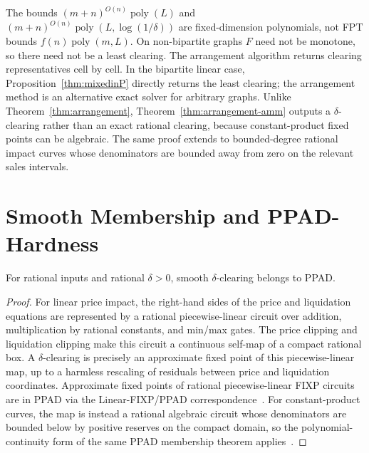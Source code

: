 \documentclass{llncs}
\newcommand{\poly}{\operatorname{poly}}
\begin{document}
\begin{remark}
The bounds \((m+n)^{O(n)}\poly(L)\) and \((m+n)^{O(n)}\poly(L,\log(1/\delta))\) are fixed-dimension polynomials, not FPT bounds \(f(n)\poly(m,L)\). On non-bipartite graphs \(F\) need not be monotone, so there need not be a least clearing. The arrangement algorithm returns clearing representatives cell by cell. In the bipartite linear case, Proposition~\ref{thm:mixedinP} directly returns the least clearing; the arrangement method is an alternative exact solver for arbitrary graphs. Unlike Theorem~\ref{thm:arrangement}, Theorem~\ref{thm:arrangement-amm} outputs a \(\delta\)-clearing rather than an exact rational clearing, because constant-product fixed points can be algebraic. The same proof extends to bounded-degree rational impact curves whose denominators are bounded away from zero on the relevant sales intervals.
\end{remark}

\section{Smooth Membership and PPAD-Hardness}
\label{sec:hardness}
\begin{proposition}
For rational inputs and rational \(\delta>0\), smooth \(\delta\)-clearing belongs to PPAD.
\end{proposition}
\begin{proof}
For linear price impact, the right-hand sides of the price and liquidation equations are represented by a rational piecewise-linear circuit over addition, multiplication by rational constants, and min/max gates. The price clipping and liquidation clipping make this circuit a continuous self-map of a compact rational box. A \(\delta\)-clearing is precisely an approximate fixed point of this piecewise-linear map, up to a harmless rescaling of residuals between price and liquidation coordinates. Approximate fixed points of rational piecewise-linear FIXP circuits are in PPAD via the Linear-FIXP/PPAD correspondence~\cite{EtessamiYannakakis2010}. For constant-product curves, the map is instead a rational algebraic circuit whose denominators are bounded below by positive reserves on the compact domain, so the polynomial-continuity form of the same PPAD membership theorem applies~\cite[Proposition~2]{EtessamiYannakakis2010}.
\end{proof}
\end{document}
